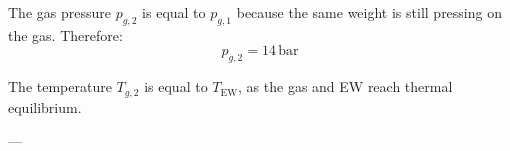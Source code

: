 The gas pressure \( p_{g,2} \) is equal to \( p_{g,1} \) because the same weight is still pressing on the gas. Therefore:  
\[
p_{g,2} = 14 \, \text{bar}
\]  

The temperature \( T_{g,2} \) is equal to \( T_{\text{EW}} \), as the gas and EW reach thermal equilibrium.  

---